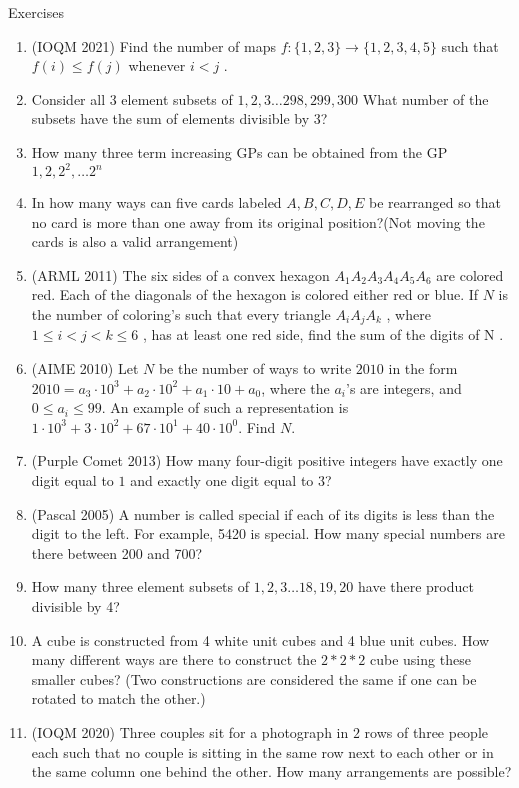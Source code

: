 \begin{xcb}{Exercises}
\begin{enumerate}
\item (IOQM 2021) Find the number of maps $f:\{1, 2, 3\} \rightarrow \{1, 2, 3, 4, 5\}$ such that $f (i) \leq f (j)$ whenever $i < j$ .
\item Consider all 3 element subsets of ${1,2,3 \dots 298, 299,300}$ What number of the subsets have the sum of elements divisible by 3?
\item How many three term increasing GPs can be obtained from the GP $1, 2, 2^2, \dots 2^n$
\item In how many ways can five cards labeled $A,B,C,D,E$ be rearranged so that no card is more than one away from its original position?(Not moving the cards is also a valid arrangement)
\item (ARML 2011) The six sides of a convex hexagon $A_1A_2A_3A_4A_5A_6$ are colored red. Each of the diagonals of the hexagon is colored either red or blue. If $N$ is the number of coloring's such that every triangle $A_iA_jA_k$ , where $1 \leq i < j < k \leq 6$ , has at least one red side, find the sum of the digits of N .
\item (AIME 2010) Let $N$ be the number of ways to write $2010$ in the form $2010 = a_3 \cdot 10^3 + a_2 \cdot 10^2 + a_1 \cdot 10 + a_0$, where the $a_i$'s are integers, and $0 \le a_i \le 99$. An example of such a representation is $1\cdot 10^3 + 3\cdot 10^2 + 67\cdot 10^1 + 40\cdot 10^0$. Find $N$.
\item (Purple Comet 2013) How many four-digit positive integers have exactly one digit equal to $1$ and exactly one digit equal to $3$?
\item (Pascal 2005) A number is called special if each of its digits is less than the digit to the left. For example, 5420 is special. How many special numbers are there between 200 and 700?
\item How many three element subsets of ${1,2,3 \dots 18, 19, 20}$ have there product divisible by 4?
\item A cube is constructed from 4 white unit cubes and 4 blue unit cubes. How many different ways are there to construct the $2*2*2$ cube using these smaller cubes? (Two constructions are considered the same if one can be rotated to match the other.)
\item (IOQM 2020) Three couples sit for a photograph in $2$ rows of three people each such that no couple is sitting in the same row next to each other or in the same column one behind the other. How many arrangements are possible?

\end{enumerate}
\end{xcb}
